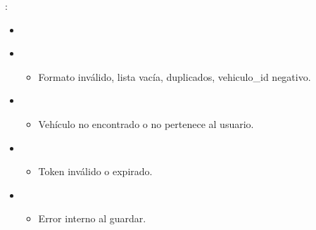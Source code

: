 \documentclass[a4paper,11pt,spanish]{sphinxmanual}
\begin{document}
\begin{fulllineitems}
\sphinxAtStartPar
{}:
\begin{itemize}
\item {} 
\sphinxAtStartPar
{}

\begin{sphinxVerbatim}[commandchars=\\\{\}]
\end{sphinxVerbatim}

\item {} 
\sphinxAtStartPar
{}
\begin{itemize}
\item {} 
\sphinxAtStartPar
Formato inválido, lista vacía, duplicados, vehiculo\_id negativo.

\end{itemize}

\begin{sphinxVerbatim}[commandchars=\\\{\}]
\end{sphinxVerbatim}

\item {} 
\sphinxAtStartPar
{}
\begin{itemize}
\item {} 
\sphinxAtStartPar
Vehículo no encontrado o no pertenece al usuario.

\end{itemize}

\begin{sphinxVerbatim}[commandchars=\\\{\}]
\end{sphinxVerbatim}

\item {} 
\sphinxAtStartPar
{}
\begin{itemize}
\item {} 
\sphinxAtStartPar
Token inválido o expirado.

\end{itemize}

\item {} 
\sphinxAtStartPar
{}
\begin{itemize}
\item {} 
\sphinxAtStartPar
Error interno al guardar.

\end{itemize}

\end{itemize}

\end{fulllineitems}
\end{document}
